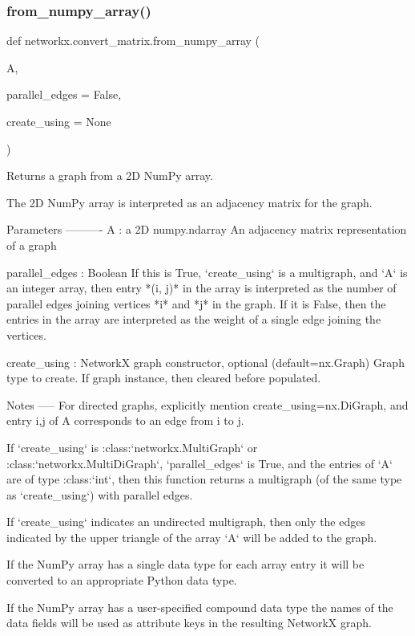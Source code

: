 \subsubsection{\texorpdfstring{from\+\_\+numpy\+\_\+array()}{from\_numpy\_array()}}
{\footnotesize\ttfamily def networkx.\+convert\+\_\+matrix.\+from\+\_\+numpy\+\_\+array (\begin{DoxyParamCaption}\item[{}]{A,  }\item[{}]{parallel\+\_\+edges = {\ttfamily False},  }\item[{}]{create\+\_\+using = {\ttfamily None} }\end{DoxyParamCaption})}

\begin{DoxyVerb}Returns a graph from a 2D NumPy array.

The 2D NumPy array is interpreted as an adjacency matrix for the graph.

Parameters
----------
A : a 2D numpy.ndarray
    An adjacency matrix representation of a graph

parallel_edges : Boolean
    If this is True, `create_using` is a multigraph, and `A` is an
    integer array, then entry *(i, j)* in the array is interpreted as the
    number of parallel edges joining vertices *i* and *j* in the graph.
    If it is False, then the entries in the array are interpreted as
    the weight of a single edge joining the vertices.

create_using : NetworkX graph constructor, optional (default=nx.Graph)
   Graph type to create. If graph instance, then cleared before populated.

Notes
-----
For directed graphs, explicitly mention create_using=nx.DiGraph,
and entry i,j of A corresponds to an edge from i to j.

If `create_using` is :class:`networkx.MultiGraph` or
:class:`networkx.MultiDiGraph`, `parallel_edges` is True, and the
entries of `A` are of type :class:`int`, then this function returns a
multigraph (of the same type as `create_using`) with parallel edges.

If `create_using` indicates an undirected multigraph, then only the edges
indicated by the upper triangle of the array `A` will be added to the
graph.

If the NumPy array has a single data type for each array entry it
will be converted to an appropriate Python data type.

If the NumPy array has a user-specified compound data type the names
of the data fields will be used as attribute keys in the resulting
NetworkX graph.


\end{DoxyVerb}
